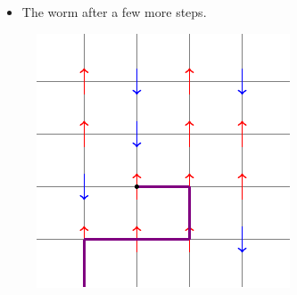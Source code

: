 \documentclass{beamer}
\begin{document}
\begin{frame}
\begin{itemize}
    \item The worm after a few more steps.
\end{itemize}
\begin{figure}
    \centering
    \includegraphics{tikz4.pdf}
\end{figure}
\end{frame}
\end{document}
